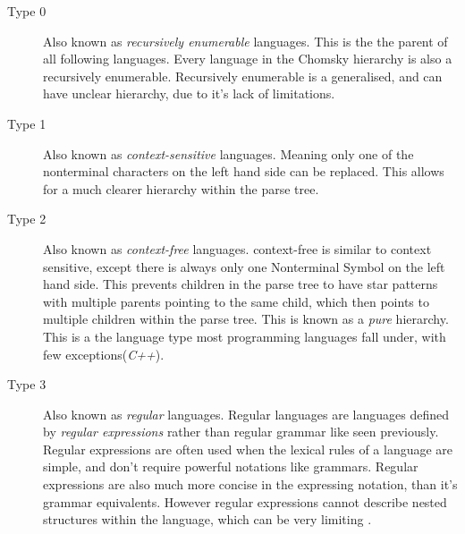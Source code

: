 \begin{description}
    \item[Type 0] Also known as \emph{recursively enumerable} languages. This is the the parent of all following languages. Every language in the Chomsky hierarchy is also a recursively enumerable. Recursively enumerable is a generalised, and can have unclear hierarchy, due to it's lack of limitations.
    \item[Type 1] Also known as \emph{context-sensitive} languages. Meaning only one of the nonterminal characters on the left hand side can be replaced. This allows for a much clearer hierarchy within the parse tree.
    \item[Type 2] Also known as \emph{context-free} languages. context-free is similar to context sensitive, except there is always only one Nonterminal Symbol on the left hand side. This prevents children in the parse tree to have star patterns with multiple parents pointing to the same child, which then points to multiple children within the parse tree. This is known as a \emph{pure} hierarchy. This is a the language type most programming languages fall under, with few exceptions(\emph{C++}).
    \item[Type 3]  Also known as \emph{regular} languages. Regular languages are languages defined by \emph{regular expressions} rather than regular grammar like seen previously. Regular expressions are often used when the lexical rules of a language are simple, and don't require powerful notations like grammars. Regular expressions are also much more concise in the expressing notation, than it's grammar equivalents. However regular expressions cannot describe nested structures within the language, which can be very limiting \cite{DragonBook}.
\end{description}
\newpage
